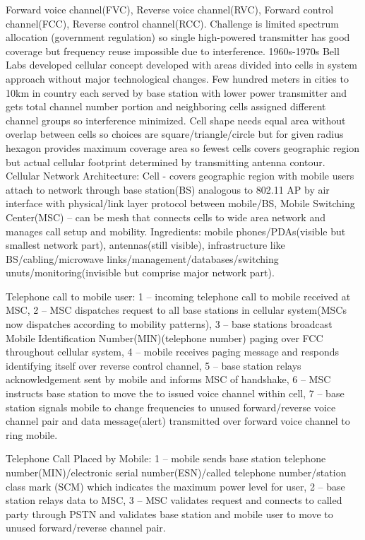 \documentclass[9pt]{extarticle}
\begin{document}
\begin{multicols}{2}
Forward voice channel(FVC), Reverse voice channel(RVC), Forward control channel(FCC), Reverse control channel(RCC). Challenge is limited spectrum allocation (government regulation) so single high-powered transmitter has good coverage but frequency reuse impossible due to interference. 1960s-1970s Bell Labs developed cellular concept developed with areas divided into cells in system approach without major technological changes. Few hundred meters in cities to 10km in country each served by base station with lower power transmitter and gets total channel number portion and neighboring cells assigned different channel groups so interference minimized. Cell shape needs equal area without overlap between cells so choices are square/triangle/circle but for given radius hexagon provides maximum coverage area so fewest cells covers geographic region but actual cellular footprint determined by transmitting antenna contour. Cellular Network Architecture: Cell - covers geographic region with mobile users attach to network through base station(BS) analogous to 802.11 AP by air interface with physical/link layer protocol between mobile/BS, Mobile Switching Center(MSC) – can be mesh that connects cells to wide area network and manages call setup and mobility. Ingredients: mobile phones/PDAs(visible but smallest network part), antennas(still visible), infrastructure like BS/cabling/microwave links/management/databases/switching unuts/monitoring(invisible but comprise major network part). 

Telephone call to mobile user: 1 – incoming telephone call to mobile received at MSC, 2 – MSC dispatches request to all base stations in cellular system(MSCs now dispatches according to mobility patterns), 3 – base stations broadcast Mobile Identification Number(MIN)(telephone number) paging over FCC throughout cellular system, 4 – mobile receives paging message and responds identifying itself over reverse control channel, 5 – base station relays acknowledgement sent by mobile and informs MSC of handshake, 6 – MSC instructs base station to move the to issued voice channel within cell, 7 – base station signals mobile to change frequencies to unused forward/reverse voice channel pair and data message(alert) transmitted over forward voice channel to ring mobile.

Telephone Call Placed by Mobile: 1 – mobile sends base station telephone number(MIN)/electronic serial number(ESN)/called telephone number/station class mark (SCM) which indicates the
maximum power level for user, 2 – base station relays data to MSC, 3 – MSC validates request and connects to called party through PSTN and validates base station and mobile user to move to unused forward/reverse channel pair.


\end{multicols}
\end{document}
